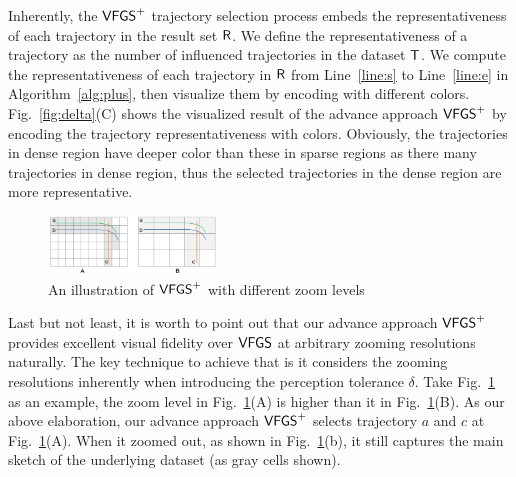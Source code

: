 Inherently, the $\mathsf{VFGS}^{+}$ trajectory selection process embeds the representativeness of each trajectory in the result set $\mathsf{R}$.
We define the representativeness of a trajectory as the number of influenced trajectories in the dataset $\mathsf{T}$.
We compute the representativeness of each trajectory in $\mathsf{R}$ from Line~\ref{line:s} to Line~\ref{line:e} in Algorithm~\ref{alg:plus}, then visualize them by encoding with different colors.
Fig.~\ref{fig:delta}(C) shows the visualized result of the  advance approach $\mathsf{VFGS}^{+}$ by encoding the trajectory representativeness with colors.
Obviously, the trajectories in dense region have deeper color than these in sparse regions as there many trajectories in dense region, thus the selected trajectories in the dense region are more representative.

\begin{figure}[t]
	\centering
	\includegraphics[width=0.4\textwidth]{pictures/problemsolveing/one_to_many.pdf}
	\vspace{-3mm}
	\caption{An illustration of $\mathsf{VFGS}^{+}$ with different zoom levels}
	\label{fig:zoom}
    \vspace{-6mm}
\end{figure}

Last but not least, it is worth to point out that our advance approach $\mathsf{VFGS}^{+}$ provides excellent visual fidelity over $\mathsf{VFGS}$ at arbitrary zooming resolutions naturally.
The key technique to achieve that is it considers the zooming resolutions inherently when introducing the perception tolerance $\delta$.
Take Fig.~\ref{fig:zoom} as an example, %
the zoom level in Fig.~\ref{fig:zoom}(A) is higher than it in Fig.~\ref{fig:zoom}(B).
As our above elaboration, our advance approach $\mathsf{VFGS}^{+}$ selects trajectory $a$ and $c$ at Fig.~\ref{fig:zoom}(A).
When it zoomed out, as shown in Fig.~\ref{fig:zoom}(b), it still captures the main sketch of the underlying dataset (as gray cells shown).







